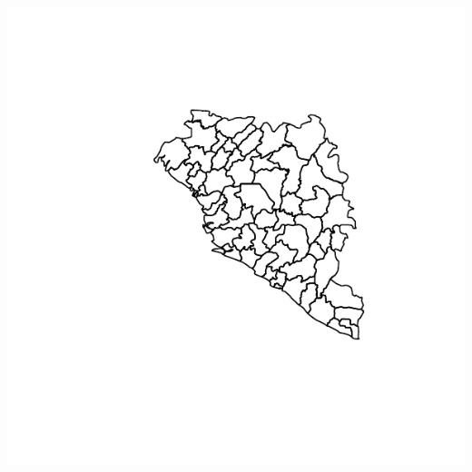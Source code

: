 \documentclass{article}\usepackage{graphicx, color}
\newenvironment{knitrout}{}{} %
\begin{document}
\begin{knitrout}
{\centering \includegraphics[width=\textwidth]{figs/unnamed-chunk-13} 

}



\end{knitrout}
\end{document}
